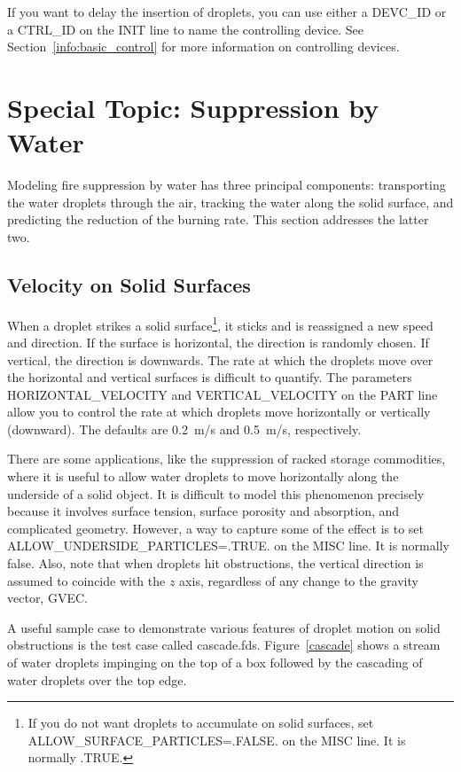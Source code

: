 \documentclass[11pt]{book}
\begin{document}
If you want to delay the insertion of droplets, you can use either a {\ct DEVC\_ID} or a {\ct CTRL\_ID} on the {\ct INIT} line to name the controlling device. See Section~\ref{info:basic_control} for more information on controlling devices.



\section{Special Topic: Suppression by Water}
\label{info:suppression}

Modeling fire suppression by water has three principal components: transporting the water droplets through the air, tracking the water along the solid surface, and predicting the reduction of the burning rate. This section addresses the latter two.


\subsection{Velocity on Solid Surfaces}
\label{info:surface_droplets}

When a droplet strikes a solid surface\footnote{If you do not want droplets to accumulate on solid surfaces, set {\ct ALLOW\_SURFACE\_PARTICLES=.FALSE.} on the {\ct MISC} line. It is normally {\ct .TRUE.}}, it sticks and is reassigned a new speed and direction. If the surface is horizontal, the direction is randomly chosen. If vertical, the direction is downwards. The rate at which the droplets move over the horizontal and vertical surfaces is difficult to quantify. The parameters {\ct HORIZONTAL\_VELOCITY} and {\ct VERTICAL\_VELOCITY} on the {\ct PART} line allow you to control the rate at which droplets move horizontally or vertically (downward). The defaults are 0.2~m/s and 0.5~m/s, respectively.

There are some applications, like the suppression of racked storage commodities, where it is useful to allow water droplets to move horizontally along the underside of a solid object. It is difficult to model this phenomenon precisely because it involves surface tension, surface porosity and absorption, and complicated geometry. However, a way to capture some of the effect is to set {\ct ALLOW\_UNDERSIDE\_PARTICLES=.TRUE.} on the {\ct MISC} line. It is normally false. Also, note that when droplets hit obstructions, the vertical direction is assumed to coincide with the $z$ axis, regardless of any change to the gravity vector, {\ct GVEC}.

A useful sample case to demonstrate various features of droplet motion on solid obstructions is the test case called {\ct cascade.fds}. Figure~\ref{cascade} shows a stream of water droplets impinging on the top of a box followed by the cascading of water droplets over the top edge.
\end{document}
